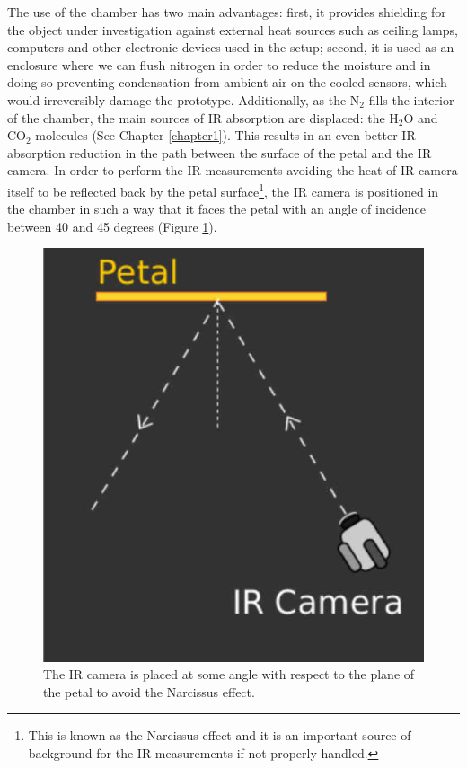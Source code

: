 		The use of the chamber has two main advantages: first, it provides shielding for the object under investigation against external heat sources such as ceiling lamps, computers and other electronic devices used in the setup; second, it is used as an enclosure where we can flush nitrogen in order to reduce the moisture and in doing so preventing condensation from ambient air on the cooled sensors, which would irreversibly damage the prototype. Additionally, as the N$_{2}$ fills the interior of the chamber, the main sources of IR absorption are displaced: the H$_{2}$O and CO$_{2}$ molecules (See Chapter \ref{chapter1}). This results in an even better IR absorption reduction in the path between the surface of the petal and the IR camera.
		In order to perform the IR measurements avoiding the heat of IR camera itself to be reflected back by the petal surface\footnote{{\footnotesize This is known as the Narcissus effect and it is an important source of background for the IR measurements if not properly handled.}}, the IR camera is positioned in the chamber in such a way that it faces the petal with an angle of incidence between 40 and 45 degrees (Figure \ref{fig2.4}).	
		
		\begin{figure}[ht!]
			\centering
			\captionsetup{justification=centering,margin=2cm}
			\includegraphics[scale=0.25]{Figures/Chapter02/NarcissusEffect.jpg}
			\caption{The IR camera is placed at some angle with respect to the plane of the petal to avoid the Narcissus effect.}\label{fig2.4}
		\end{figure}\bigskip
		
